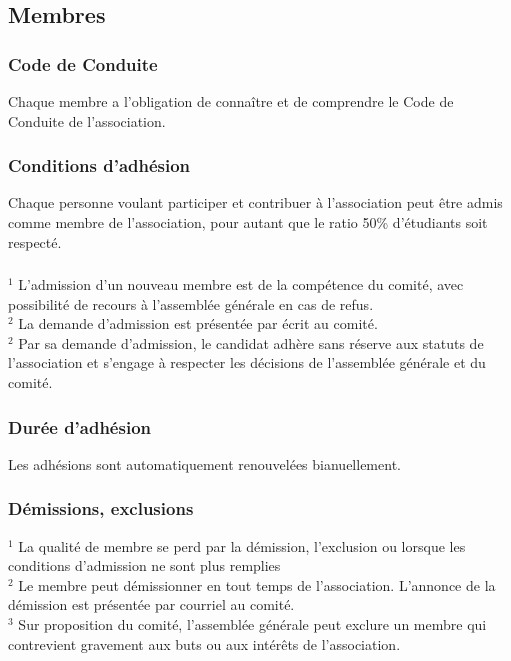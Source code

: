\documentclass[12pt,a4paper,oneside]{article}
\newcounter{art}
\newcommand{\french}{    \switchcolumn[1]\noindent}
\newcounter{para}
\begin{document}
\begin{paracol}{2}
\french 
	\subsection{Membres}


\french
	\subsubsection{Code de Conduite}
	Chaque membre a l’obligation de connaître et de comprendre le Code de Conduite de l'association.



\french
	\subsubsection{Conditions d’adhésion}
	Chaque personne voulant participer et contribuer à l’association peut être admis comme membre de l’association, pour autant que le ratio 50\% d'étudiants soit respecté.


\french
	\subsubsection{}
	$^1$ L’admission d’un nouveau membre est de la compétence du comité, avec possibilité de recours à l’assemblée générale en cas de refus. \\
	$^2$ La demande d’admission est présentée par écrit au comité. \\
	$^2$ Par sa demande d’admission, le candidat adhère sans réserve aux statuts de l’association et s’engage à respecter les décisions de l’assemblée générale et du comité.

\french
	\subsubsection{Durée d’adhésion}
	Les adhésions sont automatiquement renouvelées bianuellement.


\french
	\subsubsection{Démissions, exclusions}

	$^1$ La qualité de membre se perd par la démission, l’exclusion ou lorsque les conditions d’admission ne sont plus remplies \\
	$^2$ Le membre peut démissionner en tout temps de l’association. L’annonce de la démission est présentée par courriel au comité. \\
	$^3$ Sur proposition du comité, l’assemblée générale peut exclure un membre qui contrevient gravement aux buts ou aux intérêts de l’association.



\end{paracol}
\end{document}
